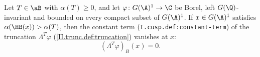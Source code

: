 Let $T\in\aB$ with $\alpha(T)\ge0$, and let $\varphi\colon G(\A)^1\to\C$ be Borel, left $G(\Q)$-invariant and bounded on every compact subset
of $G(\A)^1$. If $x\in G(\A)^1$ satisfies $\alpha(\HB(x))>\alpha(T)$, then the constant term (\texttt{I.cusp.def:constant-term}) of the truncation
$\Lambda^T\varphi$ (\cref{II.trunc.def:truncation}) vanishes at $x$:
\[
  (\Lambda^T\varphi)_B(x)=0 .
\]
